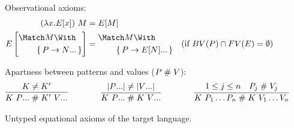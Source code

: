 \documentclass[runningheads]{llncs}
\begin{document}
\begin{figure}
Observational axioms:
\begin{align*}
  (\lambda x. E[x]) ~ M
  &=
  E[M]
  \\
  E\left[
    \begin{aligned}
      &\Match M \With \\
      &\qquad\set{\many{P \to N}}
    \end{aligned}
  \right]
  &=
  \begin{aligned}
    &\Match M \With \\
    &\qquad \set{\many{P \to E[N]}}
  \end{aligned}
  &(\text{if } BV(P) \cap FV(E) = \emptyset)
\end{align*}

Apartness between patterns and values ($P \mathrel{\#} V$):
\begin{gather*}
  \infer
  {K ~ \many{P} \apart K' ~ \many{V}}
  {K \neq K'}
  \qqqquad
  \infer
  {K ~ \many{P} \apart K ~ \many{V}}
  {|\many{P}| \neq |\many{V}|}
  \qqqquad
  \infer
  {K~P_1 \dots P_n \apart K ~ V_1 \dots V_n}
  {1 \leq j \leq n & P_j \apart V_j}
\end{gather*}

\caption{Untyped equational axioms of the target language.}
\label{fig:target-equality}
\end{figure}
\end{document}
